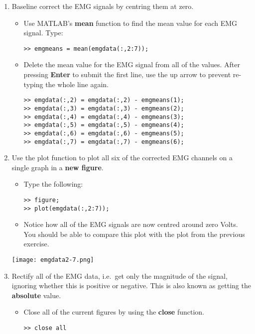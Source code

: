 \documentclass[12pt,a4paper]{article}
\begin{document}
\begin{enumerate}
	\item Baseline correct the EMG signals by centring them at zero.
	\begin{itemize}
		\item Use MATLAB's \textbf{mean} function to find the mean value for each EMG signal.  Type:
		\begin{lstlisting}[style=Matlab-editor]
>> emgmeans = mean(emgdata(:,2:7));
		\end{lstlisting}		
		\item Delete the mean value for the EMG signal from all of the values.  After pressing \textbf{Enter} to submit the first line, use the up arrow to prevent re-typing the whole line again.
		\begin{lstlisting}[style=Matlab-editor]
>> emgdata(:,2) = emgdata(:,2) - emgmeans(1);
>> emgdata(:,3) = emgdata(:,3) - emgmeans(2);
>> emgdata(:,4) = emgdata(:,4) - emgmeans(3);
>> emgdata(:,5) = emgdata(:,5) - emgmeans(4);
>> emgdata(:,6) = emgdata(:,6) - emgmeans(5);
>> emgdata(:,7) = emgdata(:,7) - emgmeans(6);
		\end{lstlisting}
	\end{itemize}
	\item Use the plot function to plot all six of the corrected EMG channels on a single graph in a \textbf{new figure}.
	\begin{itemize}
		\item Type the following:
		\begin{lstlisting}[style=Matlab-editor]
>> figure;
>> plot(emgdata(:,2:7));
		\end{lstlisting}		
		\item Notice how all of the EMG signals are now centred around zero Volts.  
		You should be able to compare this plot with the plot from the previous exercise.			
	\end{itemize}		
	\begin{center}
		\texttt{[image: emgdata2-7.png]}
	\end{center}
	\item Rectify all of the EMG data, i.e.~get only the magnitude of the signal, ignoring whether this is positive or negative.  This is also known as getting the \textbf{absolute} value.
	\begin{itemize}
		\item Close all of the current figures by using the \textbf{close} function.
		\begin{lstlisting}[style=Matlab-editor]
>> close all
		\end{lstlisting}

\end{itemize}
\end{enumerate}
\end{document}

